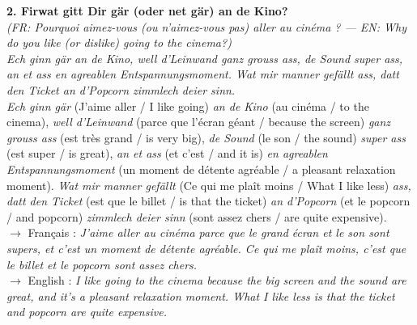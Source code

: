 \noindent\textbf{2. Firwat gitt Dir gär (oder net gär) an de Kino?}\\
\textit{(FR: Pourquoi aimez-vous (ou n'aimez-vous pas) aller au cinéma ? — EN: Why do you like (or dislike) going to the cinema?)}\\[0.3em]
\textit{Ech ginn gär an de Kino, well d'Leinwand ganz grouss ass, de Sound super ass, an et ass en agreablen Entspannungsmoment. Wat mir manner gefällt ass, datt den Ticket an d'Popcorn zimmlech deier sinn.}\\
\textit{Ech ginn gär} (J'aime aller / I like going) \textit{an de Kino} (au cinéma / to the cinema), \textit{well d'Leinwand} (parce que l'écran géant / because the screen) \textit{ganz grouss ass} (est très grand / is very big), \textit{de Sound} (le son / the sound) \textit{super ass} (est super / is great), \textit{an et ass} (et c'est / and it is) \textit{en agreablen Entspannungsmoment} (un moment de détente agréable / a pleasant relaxation moment). \textit{Wat mir manner gefällt} (Ce qui me plaît moins / What I like less) \textit{ass, datt den Ticket} (est que le billet / is that the ticket) \textit{an d'Popcorn} (et le popcorn / and popcorn) \textit{zimmlech deier sinn} (sont assez chers / are quite expensive).\\
$\rightarrow$ Français : \textit{J'aime aller au cinéma parce que le grand écran et le son sont supers, et c'est un moment de détente agréable. Ce qui me plaît moins, c'est que le billet et le popcorn sont assez chers.}\\
$\rightarrow$ English : \textit{I like going to the cinema because the big screen and the sound are great, and it's a pleasant relaxation moment. What I like less is that the ticket and popcorn are quite expensive.}\\[0.8em]

